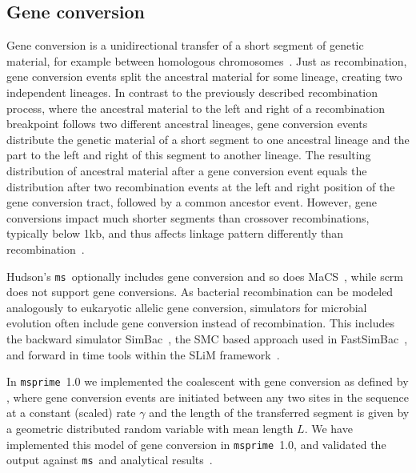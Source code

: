 \documentclass{article}
\newcommand{\msprime}[0]{\texttt{msprime}}
\newcommand{\ms}[0]{\texttt{ms}}
\begin{document}
\subsection*{Gene conversion}

Gene conversion is a unidirectional transfer of a short segment of genetic material,
for example between homologous chromosomes~\citep{chen2007gene}.
Just as recombination, gene conversion events split the ancestral material
for some lineage, creating two independent lineages.
In contrast to the previously described recombination process, where the ancestral
material to the left and right of a recombination breakpoint follows two
different ancestral lineages, gene conversion events distribute the genetic material
of a short segment to one ancestral lineage and the part to the left and right of this
segment to another lineage.
The resulting distribution of ancestral material after a gene conversion event
equals the distribution after two recombination events at the left and right position
of the gene conversion tract, followed by a common ancestor event.
However, gene conversions impact much shorter segments than crossover recombinations,
typically below 1kb, and thus affects linkage pattern differently than
recombination~\citep{korunes2017gene}.

Hudson's \ms\ optionally includes gene conversion and so does
MaCS~\citep{chen2009fast}, while scrm~\citep{staab2015scrm} does not
support gene conversions.
As bacterial recombination can be modeled analogously to eukaryotic allelic
gene conversion, simulators for microbial evolution often include gene conversion
instead of recombination.
This includes the backward simulator SimBac~\citep{brown2016simbac},
the SMC based approach used in FastSimBac~\citep{demaio2017the},
and forward in time tools within the SLiM framework~\citep{cury2020simulation}.

In \msprime\ 1.0 we implemented the coalescent with gene conversion as defined by
\cite{wiuf2000coalescent}, where gene conversion events are initiated between any
two sites in the sequence at a constant (scaled) rate $\gamma$ and
the length of the transferred segment is given by a geometric distributed
random variable with mean length $L$.
We have implemented this model of gene
conversion in \msprime\ 1.0, and validated the output against
\ms\ and analytical results~\citep{wiuf2000coalescent}.
\end{document}
